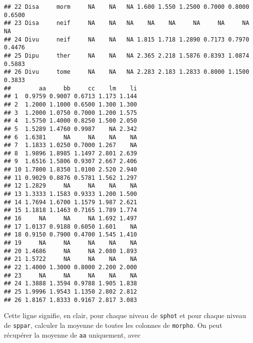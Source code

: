\begin{knitrout}
\begin{kframe}
\begin{verbatim}
## 22 Disa     morm     NA    NA   NA 1.600 1.550 1.2500 0.7000 0.8000 0.6500
## 23 Disa     neif     NA    NA   NA    NA    NA     NA     NA     NA     NA
## 24 Divu     neif     NA    NA   NA 1.815 1.718 1.2890 0.7173 0.7970 0.4476
## 25 Dipu     ther     NA    NA   NA 2.365 2.218 1.5876 0.8393 1.0874 0.5883
## 26 Divu     tome     NA    NA   NA 2.283 2.183 1.2833 0.8000 1.1500 0.3833
##        aa     bb     cc    lm    li
## 1  0.9759 0.9007 0.6713 1.173 1.144
## 2  1.2000 1.1000 0.6500 1.300 1.300
## 3  1.2000 1.0750 0.7000 1.200 1.575
## 4  1.5750 1.4000 0.8250 1.500 2.050
## 5  1.5289 1.4760 0.9987    NA 2.342
## 6  1.6381     NA     NA    NA    NA
## 7  1.1833 1.0250 0.7000 1.267    NA
## 8  1.9896 1.8985 1.1497 2.801 2.639
## 9  1.6516 1.5806 0.9307 2.667 2.406
## 10 1.7800 1.8350 1.0100 2.520 2.940
## 11 0.9029 0.8876 0.5781 1.562 1.297
## 12 1.2829     NA     NA    NA    NA
## 13 1.3333 1.1583 0.9333 1.200 1.500
## 14 1.7694 1.6700 1.1579 1.987 2.621
## 15 1.1818 1.1463 0.7165 1.789 1.774
## 16     NA     NA     NA 1.692 1.497
## 17 1.0137 0.9188 0.6050 1.601    NA
## 18 0.9150 0.7900 0.4700 1.545 1.410
## 19     NA     NA     NA    NA    NA
## 20 1.4686     NA     NA 2.080 1.893
## 21 1.5722     NA     NA    NA    NA
## 22 1.4000 1.3000 0.8000 2.200 2.000
## 23     NA     NA     NA    NA    NA
## 24 1.3888 1.3594 0.9788 1.905 1.838
## 25 1.9996 1.9543 1.1350 2.802 2.812
## 26 1.8167 1.8333 0.9167 2.817 3.083
\end{verbatim}
\end{kframe}
\end{knitrout}


\noindent Cette ligne signifie, en clair, pour chaque niveau de \texttt{sphot} et pour chaque niveau de \texttt{sppar}, calculer la moyenne de toutes les colonnes de \texttt{morpho}. 
On peut récupérer la moyenne de \texttt{aa} uniquement, avec

